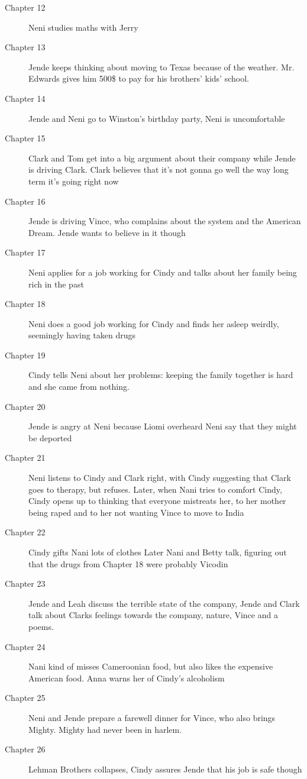 \documentclass{article}
\begin{document}
\begin{description}
 \item[Chapter 12] Neni studies maths with Jerry
 \item[Chapter 13] Jende keeps thinking about moving to Texas because of the weather. Mr. Edwards gives him 500\$ to pay for his brothers' kids' school.
 \item[Chapter 14] Jende and Neni go to Winston's birthday party, Neni is uncomfortable
 \item[Chapter 15] Clark and Tom get into a big argument about their company while Jende is driving Clark. Clark believes that it's not gonna go well the way long term it's going right now
 \item[Chapter 16] Jende is driving Vince, who complains about the system and the American Dream. Jende wants to believe in it though
 \item[Chapter 17] Neni applies for a job working for Cindy and talks about her family being rich in the past
 \item[Chapter 18] Neni does a good job working for Cindy and finds her asleep weirdly, seemingly having taken drugs
 \item[Chapter 19] Cindy tells Neni about her problems: keeping the family together is hard and she came from nothing. 
 \item[Chapter 20] Jende is angry at Neni because Liomi overheard Neni say that they might be deported
 \item[Chapter 21] Neni listens to Cindy and Clark right, with Cindy suggesting that Clark goes to therapy, but refuses. Later, when Nani tries to comfort Cindy, Cindy opens up to thinking that everyone mistreats her, to her mother being raped and to her not wanting Vince to move to India
 \item[Chapter 22] Cindy gifts Nani lots of clothes Later Nani and Betty talk, figuring out that the drugs from Chapter 18 were probably Vicodin
 \item[Chapter 23] Jende and Leah discuss the terrible state of the company, Jende and Clark talk about Clarks feelings towards the company, nature, Vince and a poems.
 \item[Chapter 24] Nani kind of misses Cameroonian food, but also likes the expensive American food. Anna warns her of Cindy's alcoholism
 \item[Chapter 25] Neni and Jende prepare a farewell dinner for Vince, who also brings Mighty. Mighty had never been in harlem.
 \item[Chapter 26] Lehman Brothers collapses, Cindy assures Jende that his job is safe though

\end{description}
\end{document}

